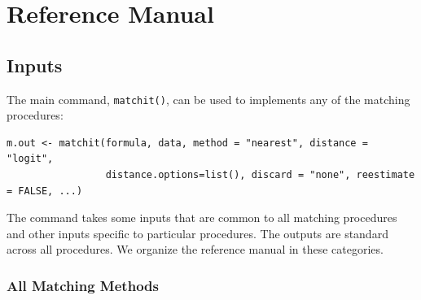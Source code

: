 \documentclass[oneside,letterpaper,titlepage]{article}
\begin{document}



\section{Reference Manual}
\label{sec:reference}

\subsection{Inputs}
\label{subsec:inputs}

The main command, \texttt{matchit()}, can be used to implements any of
the matching procedures:
\begin{verbatim}
m.out <- matchit(formula, data, method = "nearest", distance = "logit",
                 distance.options=list(), discard = "none", reestimate = FALSE, ...)
\end{verbatim}
The command takes some inputs that are common to all matching
procedures and other inputs specific to particular procedures.  The
outputs are standard across all procedures.  We organize the reference
manual in these categories.

\subsubsection{All Matching Methods}
\label{subsubsec:inputs-all}
\end{document}
